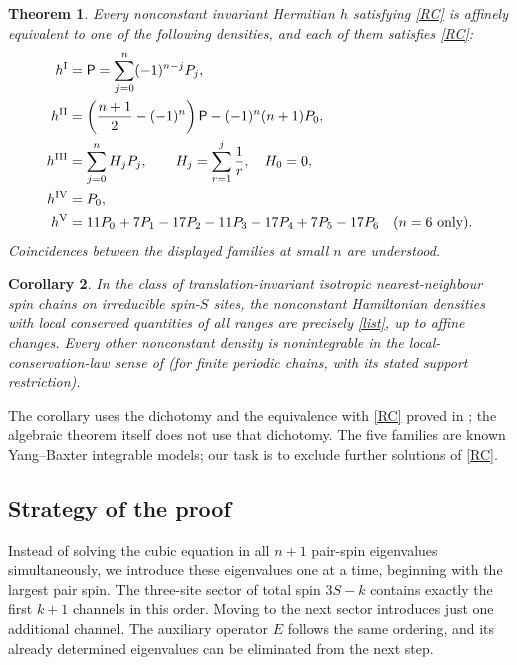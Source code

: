\documentclass[11pt]{article}
\newtheorem{theorem}{Theorem}
\newtheorem{corollary}[theorem]{Corollary}
\newcommand{\PP}{\mathsf P}
\begin{document}
\begin{theorem}\label{main}
Every nonconstant invariant Hermitian $h$ satisfying \eqref{RC} is affinely equivalent to one of the following densities, and each of them satisfies \eqref{RC}:
\begin{align}
 h^{\rm I}&=\PP=\sum_{j=0}^n(-1)^{n-j}P_j,\nonumber\\
 h^{\rm II}&=\left(\frac{n+1}{2}-(-1)^n\right)\PP-(-1)^n(n+1)P_0,\nonumber\\
 h^{\rm III}&=\sum_{j=0}^n H_j P_j,\qquad H_j=\sum_{r=1}^j\frac1r,\quad H_0=0,\nonumber\\
 h^{\rm IV}&=P_0,\nonumber\\
 h^{\rm V}&=11P_0+7P_1-17P_2-11P_3-17P_4+7P_5-17P_6\quad(n=6\text{ only}).\label{list}
\end{align}
Coincidences between the displayed families at small $n$ are understood.
\end{theorem}
\begin{corollary}
In the class of translation-invariant isotropic nearest-neighbour spin chains on irreducible spin-$S$ sites, the nonconstant Hamiltonian densities with local conserved quantities of all ranges are precisely \eqref{list}, up to affine changes. Every other nonconstant density is nonintegrable in the local-conservation-law sense of \cite{SS} (for finite periodic chains, with its stated support restriction).
\end{corollary}
The corollary uses the dichotomy and the equivalence with \eqref{RC} proved in \cite{SS}; the algebraic theorem itself does not use that dichotomy. The five families are known Yang--Baxter integrable models; our task is to exclude further solutions of \eqref{RC}.

\subsection*{Strategy of the proof}
Instead of solving the cubic equation in all $n+1$ pair-spin eigenvalues simultaneously, we introduce these eigenvalues one at a time, beginning with the largest pair spin. The three-site sector of total spin $3S-k$ contains exactly the first $k+1$ channels in this order. Moving to the next sector introduces just one additional channel. The auxiliary operator $E$ follows the same ordering, and its already determined eigenvalues can be eliminated from the next step.
\end{document}
